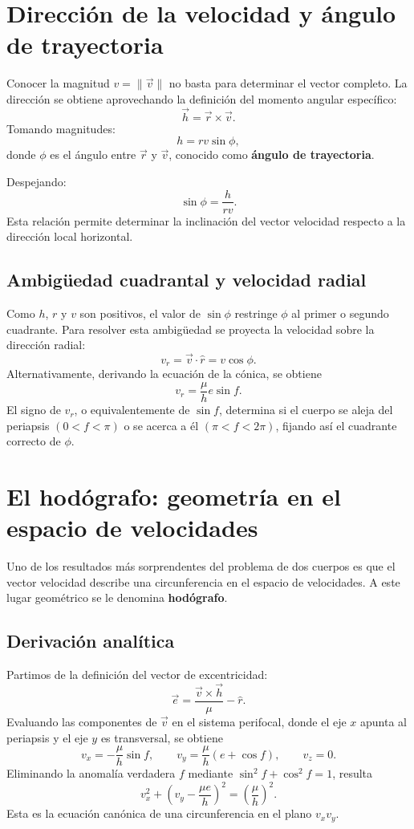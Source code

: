 \section{Dirección de la velocidad y ángulo de trayectoria}
Conocer la magnitud \(v=\|\vec{v}\|\) no basta para determinar el vector completo. La dirección se obtiene aprovechando la definición del momento angular específico:
\[
\vec{h} = \vec{r} \times \vec{v}.
\]
Tomando magnitudes:
\[
 h = rv\sin\phi,
\]
donde \(\phi\) es el ángulo entre \(\vec{r}\) y \(\vec{v}\), conocido como \textbf{ángulo de trayectoria}.

Despejando:
\[
 \sin\phi = \frac{h}{rv}.
\]
Esta relación permite determinar la inclinación del vector velocidad respecto a la dirección local horizontal.

\subsection{Ambigüedad cuadrantal y velocidad radial}
Como \(h\), \(r\) y \(v\) son positivos, el valor de \(\sin\phi\) restringe \(\phi\) al primer o segundo cuadrante. Para resolver esta ambigüedad se proyecta la velocidad sobre la dirección radial:
\[
 v_r = \vec{v} \cdot \hat{r} = v\cos\phi.
\]
Alternativamente, derivando la ecuación de la cónica, se obtiene
\[
 v_r = \frac{\mu}{h}e\sin f.
\]
El signo de \(v_r\), o equivalentemente de \(\sin f\), determina si el cuerpo se aleja del periapsis \((0<f<\pi)\) o se acerca a él \((\pi<f<2\pi)\), fijando así el cuadrante correcto de \(\phi\).

\section{El hodógrafo: geometría en el espacio de velocidades}
Uno de los resultados más sorprendentes del problema de dos cuerpos es que el vector velocidad describe una circunferencia en el espacio de velocidades. A este lugar geométrico se le denomina \textbf{hodógrafo}.

\subsection{Derivación analítica}
Partimos de la definición del vector de excentricidad:
\[
\vec{e} = \frac{\vec{v} \times \vec{h}}{\mu} - \hat{r}.
\]
Evaluando las componentes de \(\vec{v}\) en el sistema perifocal, donde el eje \(x\) apunta al periapsis y el eje \(y\) es transversal, se obtiene
\[
 v_x = -\frac{\mu}{h}\sin f, \qquad
 v_y = \frac{\mu}{h}(e+\cos f), \qquad
 v_z = 0.
\]
Eliminando la anomalía verdadera \(f\) mediante \(\sin^2 f + \cos^2 f = 1\), resulta
\[
 v_x^2 + \left(v_y - \frac{\mu e}{h}\right)^2 = \left(\frac{\mu}{h}\right)^2.
\]
Esta es la ecuación canónica de una circunferencia en el plano \(v_xv_y\).

